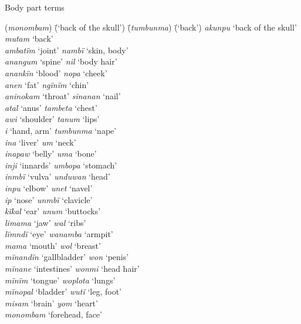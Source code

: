 \ea%
    \label{ex:sem:22}
          Body part terms
\begin{tabbing}
    {(\textit{monombam})}   \=   {(‘back of the skull’)} \= {(\textit{tumbunma})}    \=  {(‘back’)}\kill
    \textit{akunpu}   \>   ‘back of the skull’ \> \textit{mutam}    \>  ‘back’\\
    \textit{ambatïm}  \>  ‘joint’ \>       \textit{nambï}  \>    ‘skin, body’\\
    \textit{anangum}  \>  ‘spine’  \>      \textit{nil}  \>    ‘body hair’\\
    \textit{anankïn}  \>  ‘blood’   \>     \textit{nopa}    \>    ‘cheek’\\
    \textit{anen}   \>   ‘fat’   \>     \textit{ngïnïm}  \>    ‘chin’\\
    \textit{aninokam} \>   ‘throat’   \>   \textit{sinanan}  \>    ‘nail’\\
    \textit{atal}   \>   ‘anus’   \>     \textit{tambeta}   \> ‘chest’\\
    \textit{awi}   \>     ‘shoulder’  \>    \textit{tanum} \>   ‘lips’\\
    \textit{i}   \>     ‘hand, arm’  \>   \textit{tumbunma}   \>   ‘nape’\\
    \textit{ina}    \>    ‘liver’  \>      \textit{um}   \> ‘neck’\\
    \textit{inapaw} \>     ‘belly’  \>      \textit{uma}  \>      ‘bone’\\
    \textit{inji}   \>     ‘innards’ \>     \textit{umbopa}  \>    ‘stomach’\\
    \textit{inmbï}  \>    ‘vulva’  \>     \textit{unduwan}  \>  ‘head’\\
    \textit{inpu}   \>   ‘elbow’  \>    \textit{unet}  \>  ‘navel’\\
    \textit{ip}  \>    ‘nose’   \>     \textit{unmbï}   \>   ‘clavicle’\\
    \textit{kïkal}   \>     ‘ear’   \>     \textit{unum}   \>   ‘buttocks’\\
    \textit{limama}  \>  ‘jaw’    \>    \textit{wal}  \>    ‘ribs’\\
    \textit{lïmndï}   \>   ‘eye’  \>      \textit{wanamba}  \>      ‘armpit’\\
    \textit{mama}  \>    ‘mouth’   \>    \textit{wol}  \>  ‘breast’\\
    \textit{mïnandïn}  \>  ‘gallbladder’ \>   \textit{won}   \>     ‘penis’\\
    \textit{mïnane}   \>   ‘intestines’  \>  \textit{wonmi}  \>    ‘head hair’\\
    \textit{mïnïm}   \>   ‘tongue’  \>    \textit{woplota}   \>   ‘lungs’\\
    \textit{mïnopal}   \>  ‘bladder’  \>     \textit{wutï}  \>  ‘leg, foot’\\
    \textit{misam}  \>    ‘brain’   \>     \textit{yom}  \>    ‘heart’\\
    \textit{monombam} \> ‘forehead, face’  \>    { }  \>    { }
    \end{tabbing}
\z


